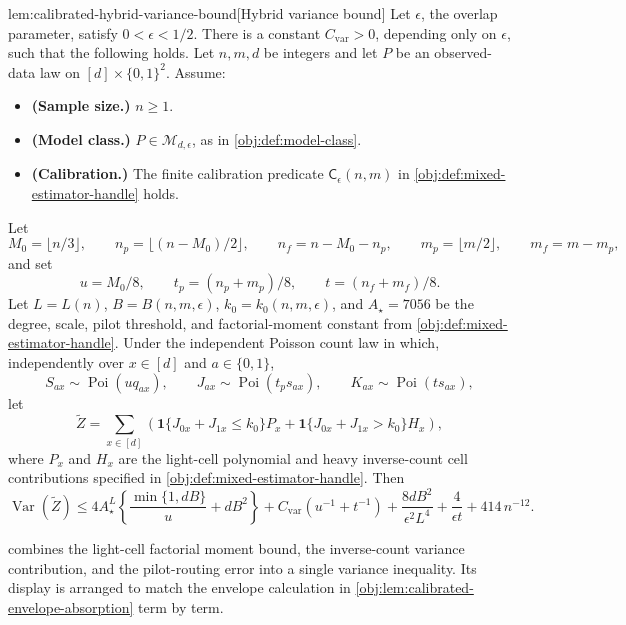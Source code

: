 \begin{lemmav}{lem:calibrated-hybrid-variance-bound}[Hybrid variance bound]
Let \(\epsilon\), the overlap parameter, satisfy \(0<\epsilon<1/2\). There is a constant \(C_{\mathrm{var}}>0\), depending only on \(\epsilon\), such that the following holds. Let \(n,m,d\) be integers and let \(P\) be an observed-data law on \([d]\times\{0,1\}^2\). Assume:
\begin{itemize}
\item \textbf{(Sample size.)} \(n\ge 1\).
\item \textbf{(Model class.)} \(P\in\mathcal M_{d,\epsilon}\), as in \cref{obj:def:model-class}.
\item \textbf{(Calibration.)} The finite calibration predicate \(\mathsf C_\epsilon(n,m)\) in \cref{obj:def:mixed-estimator-handle} holds.
\end{itemize}
Let
\[
M_0=\lfloor n/3\rfloor,\qquad
n_p=\bigl\lfloor (n-M_0)/2\bigr\rfloor,\qquad
n_f=n-M_0-n_p,\qquad
m_p=\lfloor m/2\rfloor,\qquad
m_f=m-m_p,
\]
and set
\[
u=M_0/8,\qquad
t_p=(n_p+m_p)/8,\qquad
t=(n_f+m_f)/8.
\]
Let \(L=L(n)\), \(B=B(n,m,\epsilon)\), \(k_0=k_0(n,m,\epsilon)\), and \(A_\star=7056\) be the degree, scale, pilot threshold, and factorial-moment constant from \cref{obj:def:mixed-estimator-handle}. Under the independent Poisson count law in which, independently over \(x\in[d]\) and \(a\in\{0,1\}\),
\[
S_{ax}\sim\operatorname{Poi}(u q_{ax}),\qquad
J_{ax}\sim\operatorname{Poi}(t_p s_{ax}),\qquad
K_{ax}\sim\operatorname{Poi}(t s_{ax}),
\]
let
\[
\widetilde Z
=
\sum_{x\in[d]}
\left(
\mathbf 1\{J_{0x}+J_{1x}\le k_0\}P_x
+
\mathbf 1\{J_{0x}+J_{1x}>k_0\}H_x
\right),
\]
where \(P_x\) and \(H_x\) are the light-cell polynomial and heavy inverse-count cell contributions specified in \cref{obj:def:mixed-estimator-handle}. Then
\[
\operatorname{Var}(\widetilde Z)
\le
4A_\star^L
\left\{
\frac{\min\{1,dB\}}{u}+dB^2
\right\}
+
C_{\mathrm{var}}\left(u^{-1}+t^{-1}\right)
+
\frac{8dB^2}{\epsilon^2L^4}
+
\frac{4}{\epsilon t}
+
414\,n^{-12}.
\]
\end{lemmav}

 combines the light-cell factorial moment bound, the inverse-count variance contribution, and the pilot-routing error into a single variance inequality. Its display is arranged to match the envelope calculation in \cref{obj:lem:calibrated-envelope-absorption} term by term.

